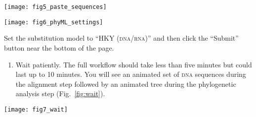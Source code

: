 \documentclass[11pt, addpoints]{exam}
\begin{document}
\newpage

\begin{center}
	\texttt{[image: fig5\_paste\_sequences]}
\end{center}

\vfill

\begin{center}
	\texttt{[image: fig6\_phyML\_settings]}
\end{center}

\noindent Set the substitution model to “HKY{} (\textsc{dna/rna})” and then click the “Submit” button near the bottom of the page.


\begin{enumerate}
\item
  Wait patiently. The full workflow should take less than five minutes but could last up to 10 minutes.
  You will see an animated set of \textsc{dna} sequences during the alignment
  step followed by an animated tree during the phylogenetic analysis
  step (Fig.~\ref{fig:wait}).
\end{enumerate}

\begin{center}
	\texttt{[image: fig7\_wait]}
\end{center}
\end{document}
